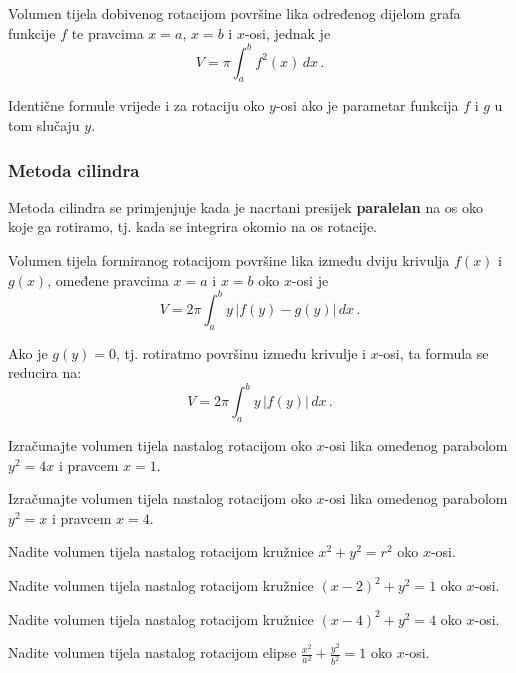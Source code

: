 Volumen tijela dobivenog rotacijom površine lika određenog dijelom grafa
funkcije $f$ te pravcima $x=a$, $x=b$ i $x$-osi, jednak je
$$
    V=\pi \int_a^b f^2(x)\,dx\,.
$$

Identične formule vrijede i za rotaciju oko $y$-osi ako je parametar funkcija
$f$ i $g$ u tom slučaju $y$.

\subsubsection{Metoda cilindra}

Metoda cilindra se primjenjuje kada je nacrtani presijek \textbf{paralelan} na
os oko koje ga rotiramo, tj. kada se integrira okomio na os rotacije.

Volumen tijela formiranog rotacijom površine lika između dviju krivulja $f(x)$ i
$g(x)$, omeđene pravcima $x=a$ i $x=b$ oko $x$-osi je
$$
V = 2\pi \int_a^b y\,|f(y) - g(y)|\,dx\,.
$$

Ako je $g(y) = 0$, tj. rotiratmo površinu između krivulje i $x$-osi, ta formula
se reducira na:
$$
V = 2\pi \int_a^b y\,|f(y)|\,dx\,.
$$

\begin{example}
    Izračunajte volumen tijela nastalog rotacijom oko $x$-osi lika omeđenog
    parabolom $y^2=4x$ i pravcem $x=1$.
\end{example}

\begin{example}
    Izračunajte volumen tijela nastalog rotacijom oko $x$-osi lika omedenog
    parabolom $y^2 = x$ i pravcem $x=4$.
\end{example}

\begin{example}
    Nadite volumen tijela nastalog rotacijom kružnice $x^2+y^2=r^2$ oko $x$-osi.
\end{example}

\begin{example}
    Nadite volumen tijela nastalog rotacijom kružnice $(x-2)^2+y^2=1$ oko
    $x$-osi.
\end{example}

\begin{example}
    Nadite volumen tijela nastalog rotacijom kružnice $(x-4)^2+y^2=4$ oko
    $x$-osi.
\end{example}

\begin{example}
    Nadite volumen tijela nastalog rotacijom elipse
    $\frac{x^2}{a^2}+\frac{y^2}{b^2}=1$ oko $x$-osi.
\end{example}
